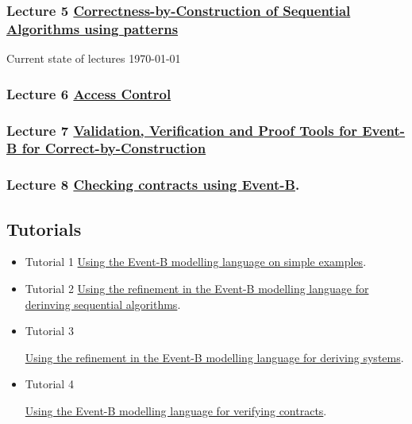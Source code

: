 \documentclass[ 12pt]{article}
\begin{document}
  \subsubsection{Lecture 5
    \href{http://mery54.github.io/teaching/mosos/lecturesnotes/mcfsi-lect2bis.pdf}{Correctness-by-Construction
      of Sequential Algorithms  using patterns}}


Current state of lectures \today 

  
\subsubsection{Lecture 6
  \href{http://mery54.github.io/teaching/mosos/lecturesnotes/mcfsi-lect5.pdf}{Access 
      Control }}

  \subsubsection{ Lecture 7
     \href{http://mery54.github.io/teaching/mosos/lecturesnotes/mcfsi-lect6.pdf}{
Validation, Verification and Proof Tools for 
Event-B for Correct-by-Construction}}

\subsubsection{ Lecture 8
     \href{http://mery54.github.io/teaching/mosos/lecturesnotes/amcfsi-lect4.pdf}{Checking 
      contracts using Event-B}.}

\subsection{Tutorials}

  \begin{itemize}
  \item[]   Tutorial 1
    \href{http://mery54.github.io/teaching/mosos/lecturesnotes/mcfsi-td1.pdf}{Using
      the Event-B modelling language on simple examples}.


          \item[]   Tutorial 2
         \href{http://mery54.github.io/teaching/mosos/lecturesnotes/mcfsi-td3.pdf}{Using 
      the refinement in 
      the Event-B modelling language  for derinving sequential algorithms}. 

    
    \item[]   Tutorial 3
   

\href{http://mery54.github.io/teaching/mosos/lecturesnotes/mcfsi-td4.pdf}{Using 
      the refinement in 
      the Event-B modelling language  for deriving  systems}.

        
    \item[]   Tutorial 4 
    
 
\href{http://mery54.github.io/teaching/mosos/lecturesnotes/mcfsi-td2.pdf}{Using 
      the Event-B modelling language  for verifying contracts}. 

  \end{itemize}
\end{document}
